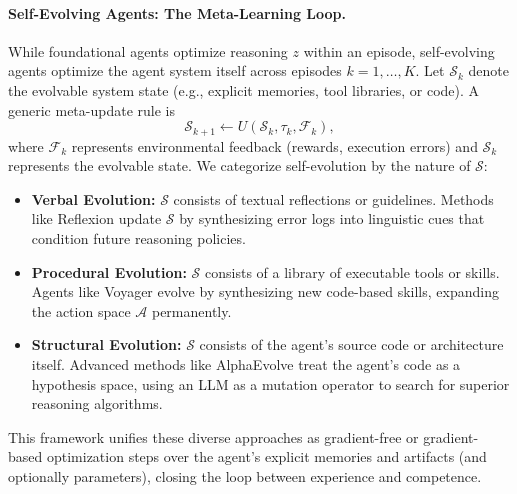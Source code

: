 \paragraph{Self-Evolving Agents: The Meta-Learning Loop.}
While foundational agents optimize reasoning $z$ within an episode, self-evolving agents optimize the agent system itself across episodes $k=1, \dots, K$. Let $\mathcal{S}_k$ denote the evolvable system state (e.g., explicit memories, tool libraries, or code). A generic meta-update rule is
\begin{equation}
\mathcal{S}_{k+1} \leftarrow U(\mathcal{S}_k, \tau_k, \mathcal{F}_k),
\end{equation}
where $\mathcal{F}_k$ represents environmental feedback (rewards, execution errors) and $\mathcal{S}_k$ represents the evolvable state. We categorize self-evolution by the nature of $\mathcal{S}$:
\begin{itemize}[leftmargin=*]
    \item \textbf{Verbal Evolution:} $\mathcal{S}$ consists of textual reflections or guidelines. Methods like Reflexion \citep{shinn2023reflexion} update $\mathcal{S}$ by synthesizing error logs into linguistic cues that condition future reasoning policies.
    \item \textbf{Procedural Evolution:} $\mathcal{S}$ consists of a library of executable tools or skills. Agents like Voyager \citep{wang2023voyager} evolve by synthesizing new code-based skills, expanding the action space $\mathcal{A}$ permanently.
    \item \textbf{Structural Evolution:} $\mathcal{S}$ consists of the agent's source code or architecture itself. Advanced methods like AlphaEvolve \citep{novikov2025alphaevolve} treat the agent's code as a hypothesis space, using an LLM as a mutation operator to search for superior reasoning algorithms.
\end{itemize}

This framework unifies these diverse approaches as gradient-free or gradient-based optimization steps over the agent's explicit memories and artifacts (and optionally parameters), closing the loop between experience and competence.
